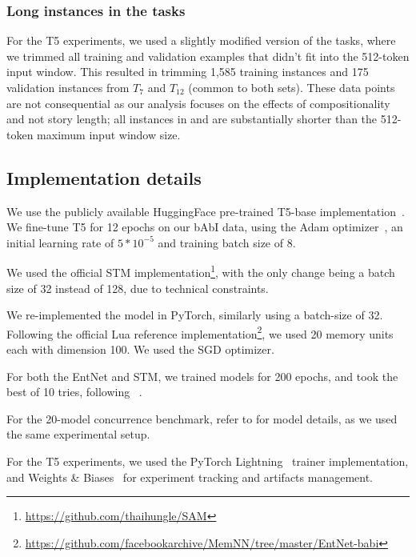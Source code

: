 



\subsubsection{Long instances in the \babibm tasks}
For the T5 experiments, we used a slightly modified version of the \babibm tasks, where we trimmed all training and validation examples that didn't fit into the 512-token input window. This resulted in trimming 1,585 training instances and 175 validation instances from $T_7$ and $T_12$ (common to both sets). These data points are not consequential as our analysis focuses on the effects of compositionality and not story length; all instances in \diversenarg and \mixnarg are substantially shorter than the 512-token maximum input window size.


\subsection{Implementation details}
\label{ssec:impl}

 We use the publicly available HuggingFace pre-trained T5-base implementation~\citep{wolf-etal-2020-transformers}. We fine-tune T5 for 12 epochs on our bAbI data, using the Adam optimizer~\citep{kingma2017adam}, an initial learning rate of $5 * 10^{-5}$ and training batch size of 8.

 We used the official STM implementation\footnote{\url{https://github.com/thaihungle/SAM}}, with the only change being a batch size of 32 instead of 128, due to technical constraints.

 We re-implemented the model in PyTorch, similarly using a batch-size of 32. Following the official Lua reference implementation\footnote{\url{https://github.com/facebookarchive/MemNN/tree/master/EntNet-babi}}, we used 20 memory units each with dimension 100. We used the SGD optimizer.

For both the EntNet and STM, we trained models for 200 epochs, and took the best of 10 tries, following ~\citet{entnet2017}.

For the 20-model concurrence benchmark, refer to \citet{liu2021small} for model details, as we used the same experimental setup.

For the T5 experiments, we used the PyTorch Lightning~\citep{falcon2019pytorch} trainer implementation, and Weights \& Biases~\citep{wandb} for experiment tracking and artifacts management.

